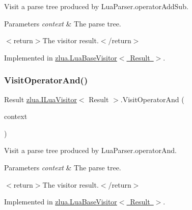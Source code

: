 Visit a parse tree produced by Lua\+Parser.\+operator\+Add\+Sub. 


\begin{DoxyParams}{Parameters}
{\em context} & The parse tree.\\
\hline
\end{DoxyParams}
$<$return$>$The visitor result.$<$/return$>$ 

Implemented in \mbox{\hyperlink{classzlua_1_1_lua_base_visitor_ac4ab12c3ec18948f72f8f04ba0df85dd}{zlua.\+Lua\+Base\+Visitor$<$ Result $>$}}.

\mbox{\label{interfacezlua_1_1_i_lua_visitor_a62f776e1b24d6689591045ba24af62a0}} 
\subsubsection{\texorpdfstring{Visit\+Operator\+And()}{VisitOperatorAnd()}}
{\footnotesize\ttfamily Result \mbox{\hyperlink{interfacezlua_1_1_i_lua_visitor}{zlua.\+I\+Lua\+Visitor}}$<$ Result $>$.Visit\+Operator\+And (\begin{DoxyParamCaption}\item[{\mbox{[}\+Not\+Null\mbox{]} \mbox{\hyperlink{classzlua_1_1_lua_parser_1_1_operator_and_context}{Lua\+Parser.\+Operator\+And\+Context}}}]{context }\end{DoxyParamCaption})}



Visit a parse tree produced by Lua\+Parser.\+operator\+And. 


\begin{DoxyParams}{Parameters}
{\em context} & The parse tree.\\
\hline
\end{DoxyParams}
$<$return$>$The visitor result.$<$/return$>$ 

Implemented in \mbox{\hyperlink{classzlua_1_1_lua_base_visitor_ae38f8049b6998fcbc7cd6374bfe1538a}{zlua.\+Lua\+Base\+Visitor$<$ Result $>$}}.

\mbox{\label{interfacezlua_1_1_i_lua_visitor_ac5cb1dcc8f0882eb1c52441549d66026}} 
